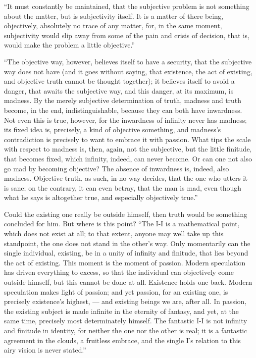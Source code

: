 \documentclass[12pt]{book}
\begin{document}
``It must constantly be maintained, that the subjective problem is not something about the matter, but is subjectivity itself. It is a matter of there being, objectively, absolutely no trace of any matter, for, in the same moment, subjectivity would slip away from some of the pain and crisis of decision, that is, would make the problem a little objective.''

``The objective way, however, believes itself to have a security, that the subjective way does not have (and it goes without saying, that existence, the act of existing, and objective truth cannot be thought together); it believes itself to avoid a danger, that awaits the subjective way, and this danger, at its maximum, is madness. By the merely subjective determination of truth, madness and truth become, in the end, indistinguishable, because they can both have inwardness. Not even this is true, however, for the inwardness of infinity never has
madness; its fixed idea is, precisely, a kind of objective something, and madness's contradiction is precisely to want to embrace it with passion. What tips the scale with respect to madness is, then, again, not the subjective, but the little finitude, that becomes fixed, which infinity, indeed, can never become. Or can one not also go mad by becoming objective? The absence of inwardness is, indeed, also madness. Objective truth, as such, in no way decides, that the one who utters it is sane; on the contrary, it can even betray, that the man is mad, even though what he says is altogether true, and especially objectively true.''

Could the existing one really be outside himself, then truth would be something concluded for him. But where is this point? ``The I-I is a mathematical point, which does not exist at all; to that extent, anyone may well take up this standpoint, the one does not stand in the other's way. Only momentarily can the single individual, existing, be in a unity of infinity and finitude, that lies beyond the act of existing. This moment is the moment of passion. Modern speculation has driven everything to excess, so that the individual can objectively come outside himself, but this cannot be done at all. Existence holds one back. Modern speculation makes light of passion; and yet passion, for an existing one, is precisely existence's highest, --- and existing beings we are, after all. In passion, the existing subject is made infinite in the eternity of fantasy, and
yet, at the same time, precisely most determinately himself. The fantastic I-I is not infinity and finitude in identity, for neither the one nor the other is real; it is a fantastic agreement in the clouds, a fruitless embrace, and the single I's relation to this airy vision is never stated.''
\end{document}
